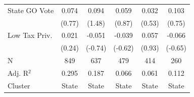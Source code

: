 \begin{tabular*}{\textwidth}{@{\extracolsep{\fill}}lccccc}
   State GO Vote        & 0.074          & 0.094          & 0.059        & 0.032         & 0.103\\   
                        & (0.77)        & (1.48)        & (0.87)      & (0.53)       & (0.75)\\   
   Low Tax Priv.        & 0.021          & -0.051         & -0.039       & 0.057         & -0.066\\   
                        & (0.24)        & (-0.74)       & (-0.62)     & (0.93)       & (-0.65)\\   
   \hline
   N         & 849            & 637            & 479          & 414           & 260\\  
   Adj. R$^2$       & 0.295          & 0.187          & 0.066        & 0.061         & 0.112\\  
   Cluster              & State & State & State & State & State\\  
   \bottomrule
\end{tabular*}
\par\endgroup
